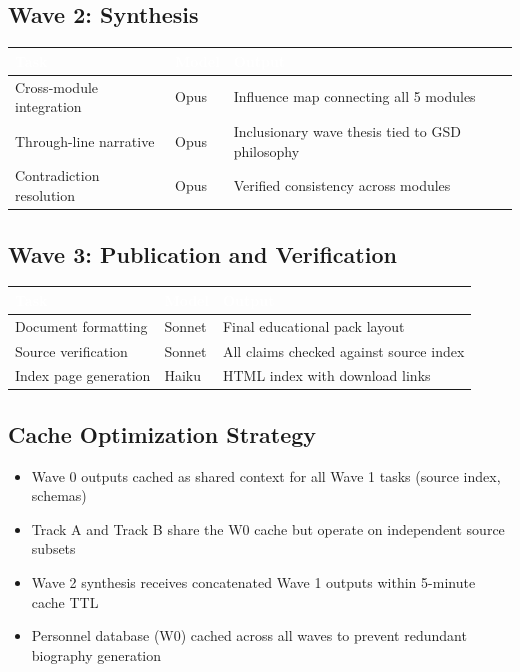 \documentclass[11pt,letterpaper]{article}
\newcommand{\tableheader}[1]{\textbf{\sffamily\textcolor{white}{#1}}}
\begin{document}
\subsection{Wave 2: Synthesis}

\begin{center}
\begin{tabularx}{\textwidth}{L{3.5cm}C{1.5cm}X}
\toprule
{}
\tableheader{Task} & \tableheader{Model} & \tableheader{Output} \\
\midrule
Cross-module integration & Opus & Influence map connecting all 5 modules \\
Through-line narrative & Opus & Inclusionary wave thesis tied to GSD philosophy \\
Contradiction resolution & Opus & Verified consistency across modules \\
\bottomrule
\end{tabularx}
\end{center}

\subsection{Wave 3: Publication and Verification}

\begin{center}
\begin{tabularx}{\textwidth}{L{3.5cm}C{1.5cm}X}
\toprule
{}
\tableheader{Task} & \tableheader{Model} & \tableheader{Output} \\
\midrule
Document formatting & Sonnet & Final educational pack layout \\
Source verification & Sonnet & All claims checked against source index \\
Index page generation & Haiku & HTML index with download links \\
\bottomrule
\end{tabularx}
\end{center}

\subsection{Cache Optimization Strategy}

\begin{itemize}[leftmargin=2em]
\item Wave 0 outputs cached as shared context for all Wave 1 tasks (source index, schemas)
\item Track A and Track B share the W0 cache but operate on independent source subsets
\item Wave 2 synthesis receives concatenated Wave 1 outputs within 5-minute cache TTL
\item Personnel database (W0) cached across all waves to prevent redundant biography generation
\end{itemize}
\end{document}
